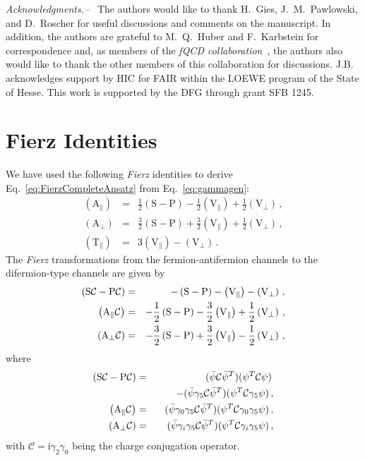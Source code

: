 \documentclass[prd,english,preprintnumbers,amsmath,amssymb,nofootinbib,twocolumn,superscriptaddress]{revtex4-1}
\def\CC{{\mathcal C}}
\newcommand{\I}{\mathrm{i}}
\newcommand{\be}{\begin{eqnarray}}
\newcommand{\ee}{\end{eqnarray}}
\newcommand{\nn}{\nonumber }
\newcommand{\psib}{\bar{\psi}}
\begin{document}
{{%
{\it Acknowledgments.--~} The authors {would like to thank H.~Gies, J.~M.~Pawlowski, and D.~Roscher}
for useful discussions and comments on the manuscript. 
In addition, the authors are grateful to M.~Q.~Huber and F.~Karbstein for correspondence and, 
as members of the {\it fQCD collaboration}~\cite{fQCD}, the authors also would like to 
thank the other members of this collaboration for discussions.
J.B. acknowledges support by HIC for FAIR within the LOEWE program of the State of Hesse. 
This work is supported by the DFG through grant SFB 1245.


\appendix

%
\section{Fierz Identities}\label{App:FierzIdentities}
%
We have used the following {\it Fierz} identities to derive Eq.~\eqref{eq:FierzCompleteAnsatz} {from Eq.~\eqref{eq:gammagen}: 
%
\be
(\text{A}_{\parallel})  &=& \frac{1}{2} (\text{S}-\text{P}) - \frac{1}{2}\left(\text{V}_{\parallel}\right) + \frac{1}{2} \left(\text{V}_{\perp}\right)\,,   \\
(\text{A}_{\perp}) &=&  \frac{3}{2} (\text{S}-\text{P})   + \frac{3}{2} \left(\text{V}_{\parallel}\right) + \frac{1}{2}\left(\text{V}_{\perp}\right)\,,   \\
\left(\text{T}_{\parallel}\right)  &=& 3\left(\text{V}_{\parallel}\right) -  \left(\text{V}_{\perp}\right)\,.
\ee
%
The} {\it Fierz} transformations from the fermion-antifermion channels to the difermion-type 
channels are given by
%
\be
\left( \text S \CC - \text P \CC \right) &=& - \left( \text S - \text P \right) - \left( \text V_\parallel \right) - \left( \text V _\perp \right)\,, \\
\left( \text A _\parallel \CC \right) &=& -\frac{1}{2} \left( \text S - \text P \right) -\frac{3}{2}  \left( \text V_\parallel \right) + \frac{1}{2} \left( \text V _\perp \right)\,, \\
\left( \text A _\perp \CC \right) &=& -\frac{3}{2} \left( \text S - \text P \right) +\frac{3}{2}  \left( \text V_\parallel \right) - \frac{1}{2} \left( \text V _\perp \right)\,,
\ee
%
where
%
\be
 \left( \text S \CC - \text P \CC \right) &=& (\psib \CC \psib^T) (\psi^T \CC \psi)\, \nn\\
 && \qquad - (\psib \gamma_5 \CC \psib^T) (\psi^T \CC \gamma_5 \psi)\,,\\
 \left( \text A _\parallel \CC \right) &=& (\psib\gamma_0 \gamma_5 \CC \psib^T) (\psi^T \CC \gamma_0 \gamma_5\psi)\,,\\
 \left( \text A _\perp \CC \right) &=& (\psib\gamma_i \gamma_5 \CC \psib^T) (\psi^T \CC \gamma_i \gamma_5\psi)\,,
 \ee
with $\CC = \I \gamma_2 \gamma_0$ being the charge conjugation operator.

}}
\end{document}
